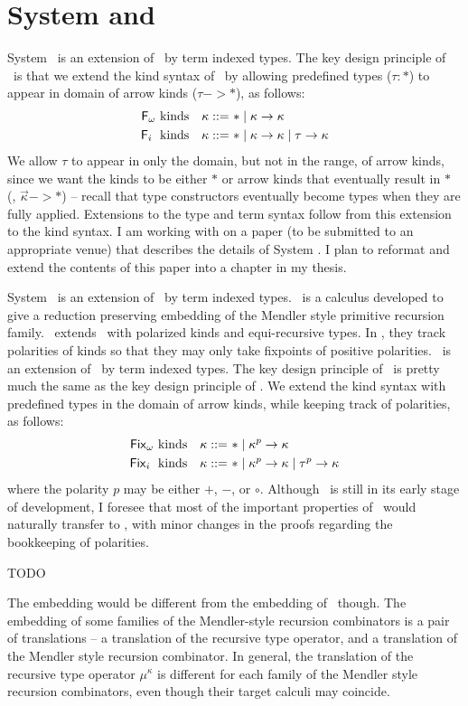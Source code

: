 \section{System \Fi and \Fixi}\label{sec:Fi}

System \Fi\ is an extension of \Fw\ by term indexed types.
The key design principle of \Fi\ is that we extend the kind syntax of \Fw\
by allowing predefined types ($\tau : *$) to appear in domain of arrow kinds
($\tau -> *$), as follows:
\begin{align*}
\text{\ensuremath{\mathsf{F}_\omega}\ kinds} ~~~ \kappa ::= ~ & * \mid \kappa -> \kappa \\
\text{\ensuremath{\mathsf{F}_i}\; kinds}~~~ \kappa ::= ~ & * \mid \kappa -> \kappa \mid \tau -> \kappa
\end{align*}
We allow $\tau$ to appear in only the domain, but not in the range, of
arrow kinds, since we want the kinds to be either $*$ or arrow kinds
that eventually result in $*$ (\ie, $\vec{\kappa} -> *$) -- recall that
type constructors eventually become types when they are fully applied.
Extensions to the type and term syntax follow from this extension to
the kind syntax. I am working with on a paper (to be submitted to an
appropriate venue) that describes the details of System \Fi. I plan to
reformat and extend the contents of this paper into a chapter in my
thesis.

System \Fixi\ is an extension of \Fixw\ by term indexed types.
\Fixw\ is a calculus developed to give a reduction preserving embedding of
the Mendler style primitive recursion family. \Fixw\ extends \Fw\ with
polarized kinds and equi-recursive types. In \Fixi, they track polarities of
kinds so that they may only take fixpoints of positive polarities.
\Fixi\ is an extension of \Fixw\ by term indexed types. The key design principle
of \Fixi\ is pretty much the same as the key design principle of \Fi.
We extend the kind syntax with predefined types in the domain of arrow kinds,
while keeping track of polarities, as follows:
\begin{align*}
\text{\ensuremath{\mathsf{Fix}_\omega}\ kinds} ~~~ \kappa ::= ~ & * \mid \kappa^p -> \kappa \\
\text{\ensuremath{\mathsf{Fix}_i}\; kinds}~~~ \kappa ::= ~ & * \mid \kappa^p -> \kappa \mid \tau^p -> \kappa
\end{align*}
where the polarity $p$ may be either $+$, $-$, or $\circ$.
Although \Fixi\ is still in its early stage of development, I foresee that
most of the important properties of \Fi\ would naturally transfer to \Fixi,
with minor changes in the proofs regarding the bookkeeping of polarities.


TODO

The embedding would be different from
the embedding of \MPr\ though. The embedding of some families of
the Mendler-style recursion combinators is a pair of translations --
a translation of the recursive type operator, and a translation of
the Mendler style recursion combinator. In general, the translation of
the recursive type operator $\mu^\kappa$ is different for each family
of the Mendler style recursion combinators, even though their target
calculi may coincide.

